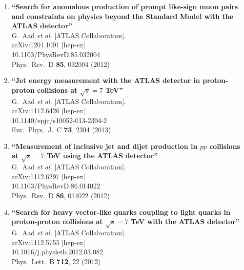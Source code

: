 \documentclass{article}
\begin{document}
\begin{enumerate}
\item%
{\bf ``Search for anomalous production of prompt like-sign muon pairs and constraints on physics beyond the Standard Model with the ATLAS detector''}
  \\{}G.~Aad {\it et al.}  [ATLAS Collaboration].
  \\{}arXiv:1201.1091 [hep-ex]
    \\{}10.1103/PhysRevD.85.032004
\\{}Phys.\ Rev.\ D {\bf 85}, 032004 (2012) %


\item%
{\bf ``Jet energy measurement with the ATLAS detector in proton-proton collisions at $\sqrt{s}=7$ TeV''}
  \\{}G.~Aad {\it et al.}  [ATLAS Collaboration].
  \\{}arXiv:1112.6426 [hep-ex]
    \\{}10.1140/epjc/s10052-013-2304-2
\\{}Eur.\ Phys.\ J.\ C {\bf 73}, 2304 (2013) %


\item%
{\bf ``Measurement of inclusive jet and dijet production in $pp$ collisions at $\sqrt{s}=7$ TeV using the ATLAS detector''}
  \\{}G.~Aad {\it et al.}  [ATLAS Collaboration].
  \\{}arXiv:1112.6297 [hep-ex]
    \\{}10.1103/PhysRevD.86.014022
\\{}Phys.\ Rev.\ D {\bf 86}, 014022 (2012) %


\item%
{\bf ``Search for heavy vector-like quarks coupling to light quarks in proton-proton collisions at $\sqrt{s}=7$ TeV with the ATLAS detector''}
  \\{}G.~Aad {\it et al.}  [ATLAS Collaboration].
  \\{}arXiv:1112.5755 [hep-ex]
    \\{}10.1016/j.physletb.2012.03.082
\\{}Phys.\ Lett.\ B {\bf 712}, 22 (2012) %



\end{enumerate}
\end{document}
